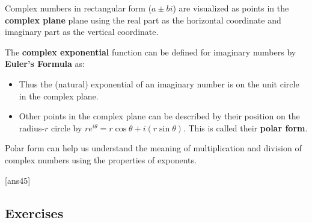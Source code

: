 \documentclass{amsbook}
\numberwithin{section}{chapter}
\numberwithin{equation}{chapter}
\newcommand{\drawgridxxyyllb}[6]{
	\draw[thick,->] (#1,0) -- (#2,0) node[right] {$#5$}; 
	\draw[thick, ->] (0,#3) -- (0,#4) node[above] {$#6$};
}
\newcommand{\qi}[1]{\begin{itemize}\item #1 \end{itemize}}
\begin{document}
Complex numbers in rectangular form ($a\pm bi$) are visualized as points in the \textbf{complex plane} plane using the real part as the horizontal coordinate and imaginary part as the vertical coordinate.


The \textbf{complex exponential} function can be defined for imaginary numbers by \textbf{Euler's Formula} as:
\qi{Thus the (natural) exponential of an imaginary number  is on the unit circle in the complex plane.}
\qi{Other points in the complex plane can be described by their position on the radius-$r$ circle by $re^{i\theta} = r\cos \theta + i(r\sin \theta)$. This is called their \textbf{polar form}\index{polar form of a complex number}.}

Polar form can help us understand the meaning of multiplication and division of complex numbers using the properties of exponents.




[ans45]
\subsection*{Exercises \nopunct} \hfill
\end{document}
